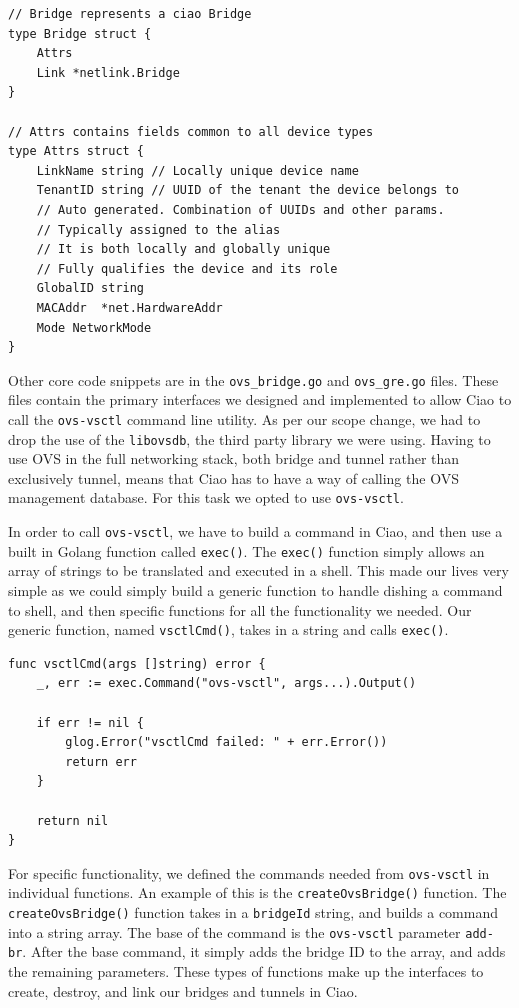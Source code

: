\documentclass[10pt,onecolumn,journal,draftclsnofoot]{IEEEtran}
\begin{document}
\begin{lstlisting}[caption={The Ciao \texttt{bridge} object, and the newly added
\texttt{mode} field in the \texttt{attrs} struct}]
// Bridge represents a ciao Bridge
type Bridge struct {
	Attrs
	Link *netlink.Bridge
}

// Attrs contains fields common to all device types
type Attrs struct {
	LinkName string // Locally unique device name
	TenantID string // UUID of the tenant the device belongs to
	// Auto generated. Combination of UUIDs and other params.
	// Typically assigned to the alias
	// It is both locally and globally unique
	// Fully qualifies the device and its role
	GlobalID string
	MACAddr  *net.HardwareAddr
	Mode NetworkMode
}

\end{lstlisting}

Other core code snippets are in the \texttt{ovs\_bridge.go} and \texttt{ovs\_gre.go}
files. These files contain the primary interfaces we designed and implemented
to allow Ciao to call the \texttt{ovs-vsctl} command line utility. As per our
scope change, we had to drop the use of the \texttt{libovsdb}, the third party
library we were using. Having to use OVS in the full networking stack, both 
bridge and tunnel rather than exclusively tunnel, means that Ciao has to have
a way of calling the OVS management database. For this task we opted to use 
\texttt{ovs-vsctl}. 

In order to call \texttt{ovs-vsctl}, we have to build a command in Ciao, and
then use a built in Golang function called \texttt{exec()}. The \texttt{exec()}
function simply allows an array of strings to be translated and executed in a
shell. This made our lives very simple as we could simply build a generic function
to handle dishing a command to shell, and then specific functions for all the
functionality we needed. Our generic function, named \texttt{vsctlCmd()}, takes
in a string and calls \texttt{exec()}. 

\begin{lstlisting}[caption={The \texttt{vsctlCmd} function takes a string 
array, and calls the \texttt{exec} function on the string array}]
func vsctlCmd(args []string) error {
	_, err := exec.Command("ovs-vsctl", args...).Output()

	if err != nil {
		glog.Error("vsctlCmd failed: " + err.Error())
		return err
	}

	return nil
}
\end{lstlisting}

For specific functionality, we defined the commands needed from \texttt{ovs-vsctl}
in individual functions. An example of this is the \texttt{createOvsBridge()} function.
The \texttt{createOvsBridge()} function takes in a \texttt{bridgeId} string, 
and builds a command into a string array. The base of the command is the
\texttt{ovs-vsctl} parameter \texttt{add-br}. After the base command, it simply
adds the bridge ID to the array, and adds the remaining parameters. These types
of functions make up the interfaces to create, destroy, and link our bridges and
tunnels in Ciao.
\end{document}
